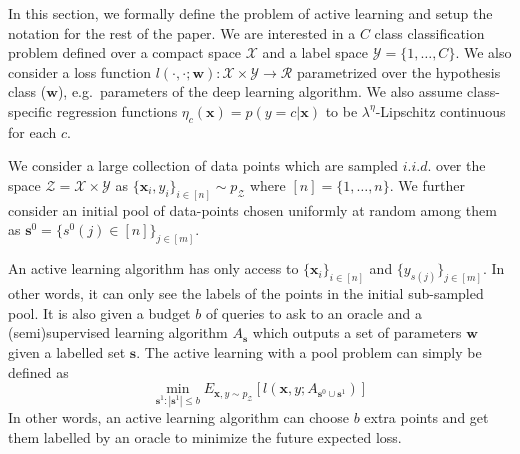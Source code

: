 \documentclass{article}
\begin{document}
In this section, we formally define the problem of active learning and setup the notation for the rest of the paper. We are interested in a $C$ class classification problem defined over a compact space $\mathcal{X}$ and a label space  $\mathcal{Y}=\{1,\ldots,C\}$. We also consider a loss function $l(\cdot,\cdot;\mathbf{w}):\mathcal{X}\times \mathcal{Y} \rightarrow \mathcal{R}$ parametrized over the hypothesis class ($\mathbf{w}$), e.g.\ parameters of the deep learning algorithm. We also assume class-specific regression functions $\eta_c(\mathbf{x})=p(y=c|\mathbf{x})$ to be \mbox{$\lambda^\eta$-Lipschitz} continuous for each $c$.

We consider a large collection of data points which are sampled $i.i.d.$ over the space  $\mathcal{Z}=\mathcal{X}\times\mathcal{Y}$ as \mbox{$\{\mathbf{x}_i,y_i\}_{i \in [n]} \sim p_\mathcal{Z}$} where $[n]=\{1,\ldots,n\}$. We further consider an initial pool of data-points chosen uniformly at random among them as \mbox{$\mathbf{s}^0=\{s^0(j) \in [n]\}_{j \in [m]}$}.

An active learning algorithm has only access to $\{\mathbf{x}_i\}_{i \in [n]}$ and $\{y_{s(j)}\}_{j \in [m] }$. In other words, it can only see the labels of the points in the initial sub-sampled pool. It is also given a budget $b$ of queries to ask to an oracle and a (semi)supervised learning algorithm $A_{\mathbf{s}}$ which outputs a set of parameters $\mathbf{w}$ given a labelled set $\mathbf{s}$. The active learning with a pool problem can simply be defined as
\begin{equation}
\min_{\mathbf{s}^1 : |\mathbf{s}^1| \leq b} E_{\mathbf{x},y \sim p_\mathcal{Z}} [l(\mathbf{x},y; A_{\mathbf{s}^0 \cup \mathbf{s}^1})]
\end{equation}
In other words, an active learning algorithm can choose $b$ extra points and get them labelled by an oracle to minimize the future expected loss.
\end{document}
